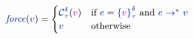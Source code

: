 \[\begin{array}{r l l}
  \sforce{\sval} =
  \begin{cases}
    \scoerce{\stau}{\sdelta}{\tval}
    & \text{if }\sexp = \salien{\tval}{\stau}{\sdelta} \text{ and }
      \sexp \sevals \sval
\\
      \sval
    & \text{otherwise}
  \end{cases}
\end{array}\]
